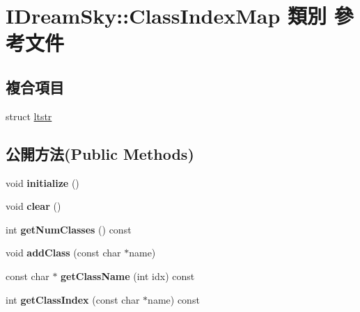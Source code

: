 \hypertarget{class_i_dream_sky_1_1_class_index_map}{}\section{I\+Dream\+Sky\+:\+:Class\+Index\+Map 類別 參考文件}
\label{class_i_dream_sky_1_1_class_index_map}
\subsection*{複合項目}
\begin{DoxyCompactItemize}
\item 
struct \hyperlink{struct_i_dream_sky_1_1_class_index_map_1_1ltstr}{ltstr}
\end{DoxyCompactItemize}
\subsection*{公開方法(Public Methods)}
\begin{DoxyCompactItemize}
\item 
void {\bfseries initialize} ()\hypertarget{class_i_dream_sky_1_1_class_index_map_a9abde835872cf39a0b240566cbe312ac}{}\label{class_i_dream_sky_1_1_class_index_map_a9abde835872cf39a0b240566cbe312ac}

\item 
void {\bfseries clear} ()\hypertarget{class_i_dream_sky_1_1_class_index_map_aa3c7d912fb4a6d11d869ae59a807628b}{}\label{class_i_dream_sky_1_1_class_index_map_aa3c7d912fb4a6d11d869ae59a807628b}

\item 
int {\bfseries get\+Num\+Classes} () const \hypertarget{class_i_dream_sky_1_1_class_index_map_a662f62e80e7e44fbe907372a2695009b}{}\label{class_i_dream_sky_1_1_class_index_map_a662f62e80e7e44fbe907372a2695009b}

\item 
void {\bfseries add\+Class} (const char $\ast$name)\hypertarget{class_i_dream_sky_1_1_class_index_map_a46ac4e8a263703c7538a2031d981b3a2}{}\label{class_i_dream_sky_1_1_class_index_map_a46ac4e8a263703c7538a2031d981b3a2}

\item 
const char $\ast$ {\bfseries get\+Class\+Name} (int idx) const \hypertarget{class_i_dream_sky_1_1_class_index_map_ad16fe94588cd8c25b1796054763b5855}{}\label{class_i_dream_sky_1_1_class_index_map_ad16fe94588cd8c25b1796054763b5855}

\item 
int {\bfseries get\+Class\+Index} (const char $\ast$name) const \hypertarget{class_i_dream_sky_1_1_class_index_map_ac570c5037088db6d99b810234f1bc86f}{}\label{class_i_dream_sky_1_1_class_index_map_ac570c5037088db6d99b810234f1bc86f}

\end{DoxyCompactItemize}
